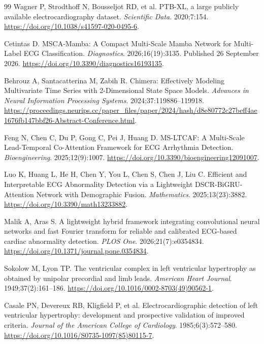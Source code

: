 \documentclass[11pt,a4paper,UTF8,fontset=windows]{ctexart}
\begin{document}
\begingroup
\setlength{\bibsep}{3pt}
\begin{thebibliography}{99}
 Wagner P, Strodthoff N, Bousseljot RD, et al. PTB-XL, a large publicly available electrocardiography dataset. \emph{Scientific Data}. 2020;7:154. \url{https://doi.org/10.1038/s41597-020-0495-6}.

 Cetintas D. MSCA-Mamba: A Compact Multi-Scale Mamba Network for Multi-Label ECG Classification. \emph{Diagnostics}. 2026;16(19):3135. Published 26 September 2026. \url{https://doi.org/10.3390/diagnostics16193135}.

 Behrouz A, Santacatterina M, Zabih R. Chimera: Effectively Modeling Multivariate Time Series with 2-Dimensional State Space Models. \emph{Advances in Neural Information Processing Systems}. 2024;37:119886--119918. \url{https://proceedings.neurips.cc/paper_files/paper/2024/hash/d8e80772c27beff4ae1676fb147bbf26-Abstract-Conference.html}.

 Feng N, Chen C, Du P, Gong C, Pei J, Huang D. MS-LTCAF: A Multi-Scale Lead-Temporal Co-Attention Framework for ECG Arrhythmia Detection. \emph{Bioengineering}. 2025;12(9):1007. \url{https://doi.org/10.3390/bioengineering12091007}.

 Luo K, Huang L, He H, Chen Y, You L, Chen S, Chen J, Liu C. Efficient and Interpretable ECG Abnormality Detection via a Lightweight DSCR-BiGRU-Attention Network with Demographic Fusion. \emph{Mathematics}. 2025;13(23):3882. \url{https://doi.org/10.3390/math13233882}.

 Malik A, Aras S. A lightweight hybrid framework integrating convolutional neural networks and fast Fourier transform for reliable and calibrated ECG-based cardiac abnormality detection. \emph{PLOS One}. 2026;21(7):e0354834. \url{https://doi.org/10.1371/journal.pone.0354834}.

 Sokolow M, Lyon TP. The ventricular complex in left ventricular hypertrophy as obtained by unipolar precordial and limb leads. \emph{American Heart Journal}. 1949;37(2):161--186. \url{https://doi.org/10.1016/0002-8703(49)90562-1}.

 Casale PN, Devereux RB, Kligfield P, et al. Electrocardiographic detection of left ventricular hypertrophy: development and prospective validation of improved criteria. \emph{Journal of the American College of Cardiology}. 1985;6(3):572--580. \url{https://doi.org/10.1016/S0735-1097(85)80115-7}.


\end{thebibliography}
\end{document}

